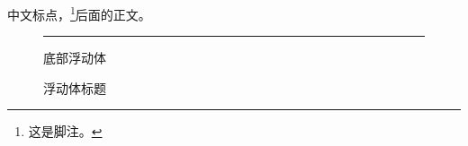 \documentclass[fontset=fandol]{ctexart}
\begin{document}
\noindent 中文标点，\footnote{这是脚注。}后面的正文。\par
\vspace*{30mm}
\begin{figure}[b]
  \centering
  \rule{45mm}{12mm}\par
  底部浮动体
  \caption{浮动体标题}
\end{figure}
\clearpage
\end{document}
